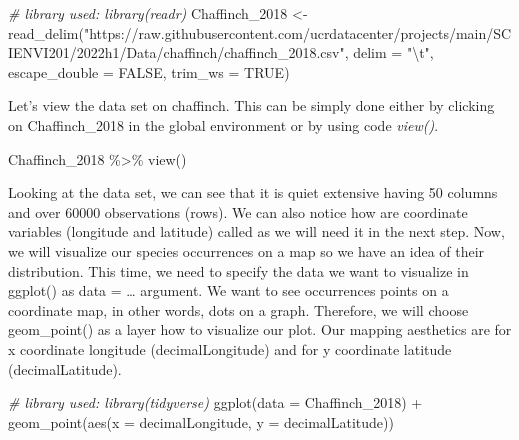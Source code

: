 \documentclass[
]{article}
\newenvironment{Shaded}{\begin{snugshade}}{\end{snugshade}}
\newcommand{\AttributeTok}[1]{\textcolor[rgb]{0.77,0.63,0.00}{#1}}
\newcommand{\CommentTok}[1]{\textcolor[rgb]{0.56,0.35,0.01}{\textit{#1}}}
\newcommand{\ConstantTok}[1]{\textcolor[rgb]{0.00,0.00,0.00}{#1}}
\newcommand{\FunctionTok}[1]{\textcolor[rgb]{0.00,0.00,0.00}{#1}}
\newcommand{\NormalTok}[1]{#1}
\newcommand{\OtherTok}[1]{\textcolor[rgb]{0.56,0.35,0.01}{#1}}
\newcommand{\SpecialCharTok}[1]{\textcolor[rgb]{0.00,0.00,0.00}{#1}}
\newcommand{\StringTok}[1]{\textcolor[rgb]{0.31,0.60,0.02}{#1}}
\begin{document}
\begin{Shaded}
\begin{Highlighting}[]
\CommentTok{\# library used: library(readr)}
\NormalTok{Chaffinch\_2018 }\OtherTok{\textless{}{-}} 
  \FunctionTok{read\_delim}\NormalTok{(}\StringTok{"https://raw.githubusercontent.com/ucrdatacenter/projects/main/SCIENVI201/2022h1/Data/chaffinch/chaffinch\_2018.csv"}\NormalTok{,}
             \AttributeTok{delim =} \StringTok{"}\SpecialCharTok{\textbackslash{}t}\StringTok{"}\NormalTok{, }\AttributeTok{escape\_double =} \ConstantTok{FALSE}\NormalTok{, }\AttributeTok{trim\_ws =} \ConstantTok{TRUE}\NormalTok{)}
\end{Highlighting}
\end{Shaded}

Let's view the data set on chaffinch. This can be simply done either by
clicking on Chaffinch\_2018 in the global environment or by using code
\emph{view()}.

\begin{Shaded}
\begin{Highlighting}[]
\NormalTok{Chaffinch\_2018 }\SpecialCharTok{\%\textgreater{}\%} \FunctionTok{view}\NormalTok{()}
\end{Highlighting}
\end{Shaded}

Looking at the data set, we can see that it is quiet extensive having 50
columns and over 60000 observations (rows). We can also notice how are
coordinate variables (longitude and latitude) called as we will need it
in the next step. Now, we will visualize our species occurrences on a
map so we have an idea of their distribution. This time, we need to
specify the data we want to visualize in ggplot() as data = \ldots{}
argument. We want to see occurrences points on a coordinate map, in
other words, dots on a graph. Therefore, we will choose geom\_point() as
a layer how to visualize our plot. Our mapping aesthetics are for x
coordinate longitude (decimalLongitude) and for y coordinate latitude
(decimalLatitude).

\begin{Shaded}
\begin{Highlighting}[]
\CommentTok{\# library used: library(tidyverse)}
\FunctionTok{ggplot}\NormalTok{(}\AttributeTok{data =}\NormalTok{ Chaffinch\_2018) }\SpecialCharTok{+}
  \FunctionTok{geom\_point}\NormalTok{(}\FunctionTok{aes}\NormalTok{(}\AttributeTok{x =}\NormalTok{ decimalLongitude, }\AttributeTok{y =}\NormalTok{ decimalLatitude))}
\end{Highlighting}
\end{Shaded}
\end{document}

